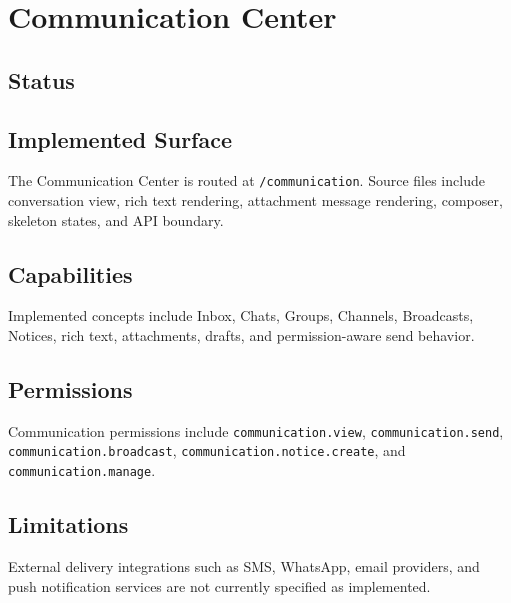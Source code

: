 \chapter{Communication Center}
\section{Status}
\statusimplemented

\section{Implemented Surface}
The Communication Center is routed at \texttt{/communication}. Source files include conversation view, rich text rendering, attachment message rendering, composer, skeleton states, and API boundary.

\section{Capabilities}
Implemented concepts include Inbox, Chats, Groups, Channels, Broadcasts, Notices, rich text, attachments, drafts, and permission-aware send behavior.

\section{Permissions}
Communication permissions include \texttt{communication.view}, \texttt{communication.send}, \texttt{communication.broadcast}, \texttt{communication.notice.create}, and \texttt{communication.manage}.

\section{Limitations}
External delivery integrations such as SMS, WhatsApp, email providers, and push notification services are not currently specified as implemented.
